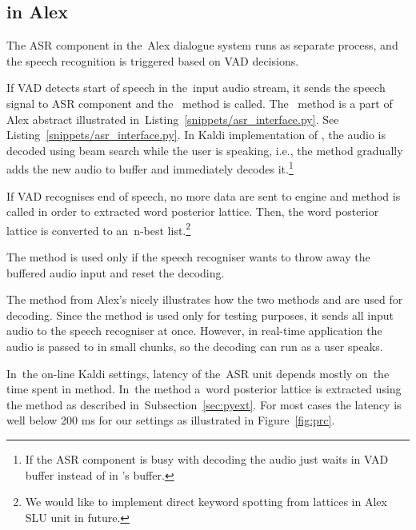\subsection{ in Alex}
\label{sub:asr_component}
The \ac{ASR} component in the~Alex dialogue system runs as separate process, and the speech recognition is triggered based on \ac{VAD} decisions.

If \ac{VAD} detects start of speech in the~input audio stream, it sends the speech signal to \ac{ASR} component and the~ method is called. 
The~ method is a part of Alex abstract  illustrated in~Listing~\ref{snippets/asr_interface.py}.
See Listing~\ref{snippets/asr_interface.py}.
In Kaldi implementation of , the audio is decoded using beam search while the user is speaking, i.e., the method  gradually adds the new audio to  buffer and immediately decodes it.\footnote{If the \ac{ASR} component is busy with decoding the audio just waits in \ac{VAD} buffer instead of in 's buffer.}

If \ac{VAD} recognises end of speech, no more data are sent to  engine and  method is called in order to extracted word posterior lattice.
Then, the word posterior lattice is converted to an~n-best list.\footnote{We would like to implement direct keyword spotting from  lattices in Alex \ac{SLU} unit in future.}

The  method is used only if the speech recogniser wants to throw away the buffered audio input and reset the decoding.


The method  from Alex's  nicely illustrates how the two methods  and  are used for decoding. 
Since the method is used only for testing purposes, it sends all input audio to the speech recogniser at once.
However, in real-time application the audio is passed to  in small chunks, so the decoding can run as a user speaks. 

In~the on-line Kaldi settings, latency of the~\ac{ASR} unit depends mostly on~the time spent in  method.
In~the  method a~word posterior lattice is extracted using the  method as described in~Subsection~\ref{sec:pyext}. 
For most cases the latency is well below 200 ms for our settings as illustrated in Figure~\ref{fig:prc}.

